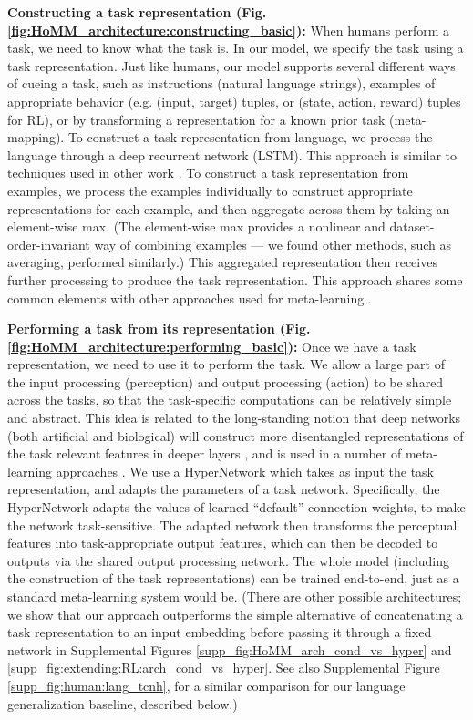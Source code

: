 \textbf{Constructing a task representation (Fig. \ref{fig:HoMM_architecture:constructing_basic}):} When humans perform a task, we need to know what the task is. In our model, we specify the task using a task representation. Just like humans, our model supports several different ways of cueing a task, such as instructions (natural language strings), examples of appropriate behavior (e.g. (input, target) tuples, or (state, action, reward) tuples for RL), or by transforming a representation for a known prior task (meta-mapping). To construct a task representation from language, we process the language through a deep recurrent network (LSTM). This approach is similar to techniques used in other work \citep[e.g.]{Hermann2017,Oh2017a,Hill2019a}. To construct a task representation from examples, we process the examples individually to construct appropriate representations for each example, and then aggregate across them by taking an element-wise max. (The element-wise max provides a nonlinear and dataset-order-invariant way of combining examples \citep[c.f.][]{Zaheer2017} --- we found other methods, such as averaging, performed similarly.) This aggregated representation then receives further processing to produce the task representation. This approach shares some common elements with other approaches used for meta-learning \citep{Garnelo2018}. 

\textbf{Performing a task from its representation (Fig. \ref{fig:HoMM_architecture:performing_basic}):} Once we have a task representation, we need to use it to perform the task. We allow a large part of the input processing (perception) and output processing (action) to be shared across the tasks, so that the task-specific computations can be relatively simple and abstract. This idea is related to the long-standing notion that deep networks (both artificial and biological) will construct more disentangled representations of the task relevant features in deeper layers \citep{Dicarlo2007, Erhan2010}, and is used in a number of meta-learning approaches \citep[e.g.]{Vinyals2016}. We use a HyperNetwork \citep{Ha2016} which takes as input the task representation, and adapts the parameters of a task network. Specifically, the HyperNetwork adapts the values of learned ``default'' connection weights, to make the network task-sensitive. The adapted network then transforms the perceptual features into task-appropriate output features, which can then be decoded to outputs via the shared output processing network. The whole model (including the construction of the task representations) can be trained end-to-end, just as a standard meta-learning system would be. (There are other possible architectures; we show that our approach outperforms the simple alternative of concatenating a task representation to an input embedding before passing it through a fixed network in Supplemental Figures \ref{supp_fig:HoMM_arch_cond_vs_hyper} and \ref{supp_fig:extending:RL:arch_cond_vs_hyper}. See also Supplemental Figure \ref{supp_fig:human:lang_tcnh}, for a similar comparison for our language generalization baseline, described below.) 

